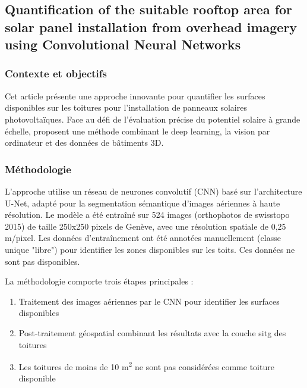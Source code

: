 \subsection{Quantification of the suitable rooftop area for solar panel installation from overhead imagery using Convolutional Neural Networks}
\label{subsec:castello_quantification_2021}

\subsubsection{Contexte et objectifs}
\par{Cet article \cite{castello_quantification_2021} présente une approche innovante pour quantifier les surfaces disponibles sur les toitures pour l'installation de panneaux solaires photovoltaïques. Face au défi de l'évaluation précise du potentiel solaire à grande échelle, \citeauthor{castello_quantification_2021} proposent une méthode combinant le deep learning, la vision par ordinateur et des données de bâtiments 3D.}

\subsubsection{Méthodologie}
\par{L'approche utilise un réseau de neurones convolutif (CNN) basé sur l'architecture U-Net, adapté pour la segmentation sémantique d'images aériennes à haute résolution. Le modèle a été entraîné sur 524 images (orthophotos de swisstopo 2015) de taille 250x250 pixels de Genève, avec une résolution spatiale de 0,25 m/pixel. Les données d'entraînement ont été annotées manuellement (classe unique "libre") pour identifier les zones disponibles sur les toits. Ces données ne sont pas disponibles.}

\par{La méthodologie comporte trois étapes principales :}
\begin{enumerate}
    \item Traitement des images aériennes par le CNN pour identifier les surfaces disponibles
    \item Post-traitement géospatial combinant les résultats avec la couche \acrshort{sitg} des toitures
    \item Les toitures de moins de 10 \si{\unit{\square\meter}} ne sont pas considérées comme toiture disponible
\end{enumerate}

